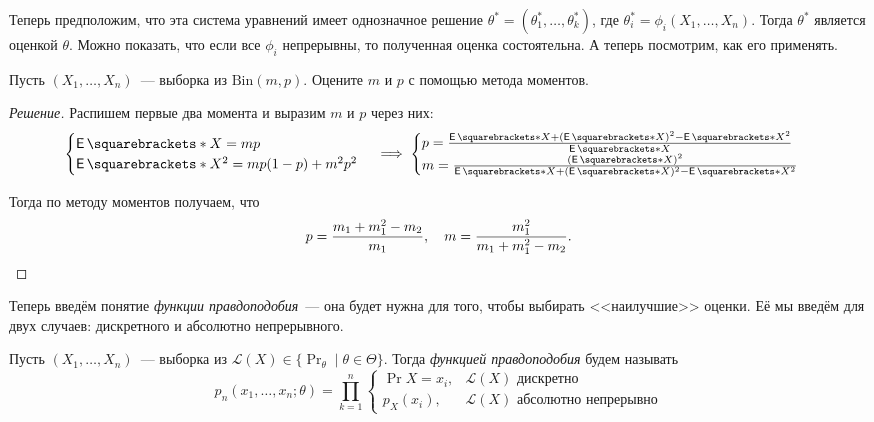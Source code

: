 Теперь предположим, что эта система уравнений имеет однозначное решение 
\(\theta^{*} = (\theta^{*}_{1}, \dots, \theta^{*}_{k})\), где \(\theta^{*}_{i} 
= \phi_{i}(X_{1}, \dots, X_{n})\). Тогда \(\theta^{*}\) является оценкой 
\(\theta\). Можно показать, что если все \(\phi_{i}\) непрерывны, то полученная 
оценка состоятельна. А теперь посмотрим, как его применять.

\begin{problem}
	Пусть \((X_{1}, \dots, X_{n})\)~--- выборка из \(\mathrm{Bin}(m, p)\). 
	Оцените \(m\) и \(p\) с помощью метода моментов.
\end{problem}
\begin{proof}[Решение]
	Распишем первые два момента и выразим \(m\) и \(p\) через них:
	\[
		\begin{cases}
		\E{X} = mp \\
		\E{X^{2}} = mp(1 - p) + m^{2}p^{2}
		\end{cases}
		\implies 
		\begin{cases}
		p = \frac{\E{X} + (\E{X})^2 - \E{X^2}}{\E{X}} \\
		m = \frac{(\E{X})^2}{\E{X} + (\E{X})^2 - \E{X^2}}
		\end{cases}
	\]

	Тогда по методу моментов получаем, что
	\[
		p = \frac{m_{1} + m_{1}^{2} - m_{2}}{m_{1}}, \quad m = 
		\frac{m_{1}^{2}}{m_{1} + m_{1}^{2} - m_{2}}. \qedhere
	\]
\end{proof}

Теперь введём понятие \emph{функции правдоподобия}~--- она будет нужна для 
того, чтобы выбирать <<наилучшие>> оценки. Её мы введём для двух случаев: 
дискретного и абсолютно непрерывного. 
\begin{definition}
	Пусть \((X_{1}, \dots, X_{n})\)~--- выборка из \(\mathcal{L}(X) \in 
	\{\Pr_{\theta} \mid \theta \in \Theta\}\). Тогда \emph{функцией 
	правдоподобия} будем называть
	\[
		p_{n}(x_{1}, \dots, x_{n}; \theta) = \prod_{k = 1}^{n}
		\begin{cases}
		\Pr{X = x_{i}}, & \mathcal{L}(X)\text{ дискретно} \\
		p_{X}(x_{i}), & \mathcal{L}(X)\text{ абсолютно непрерывно}
		\end{cases}
	\]
\end{definition}